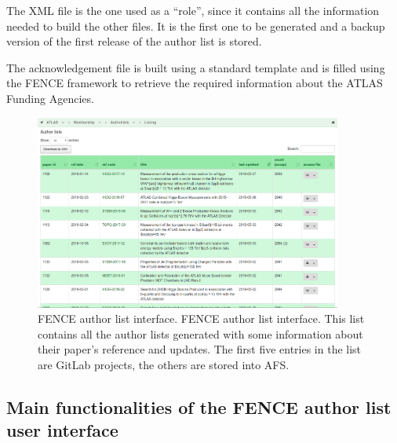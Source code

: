 The XML file is the one used as a \enquote{role}, since it contains all the information needed to build the other files.
It is the first one to be generated and a backup version of the first release of the author list is stored.

The acknowledgement  file is built using a standard template and is filled using the FENCE framework to retrieve the required information about the ATLAS Funding Agencies.




\begin{figure}[htb]
  \centering
  \includegraphics[width=0.9\textwidth]{figures/authorlist_interface.png}%
  \caption{FENCE author list interface.
    FENCE author list interface. This list contains all the author lists generated with some information about their paper's reference and updates. The first five entries in the list are GitLab projects, the others are stored into AFS.}
  \label{fig:authorlist_interface}
\end{figure}

\subsection{Main functionalities of the FENCE author list user interface}
\label{sec:Main_functionalities_of_the_FENCE_Author_list_user_interface}

